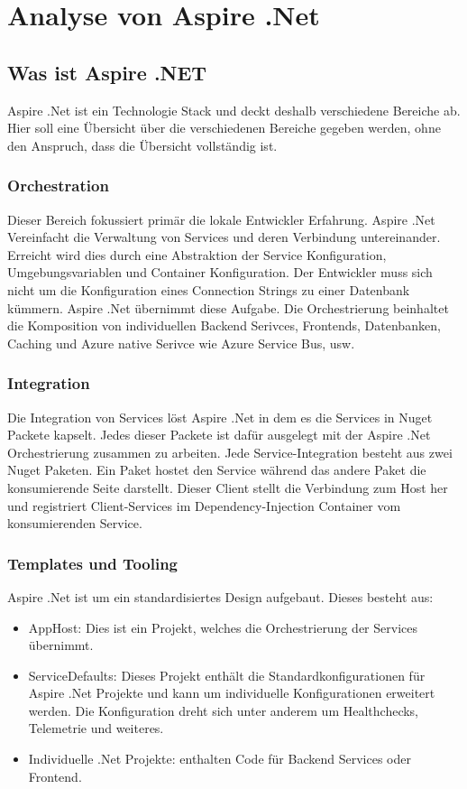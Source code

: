 \section{Analyse von Aspire .Net}

    \subsection{Was ist Aspire .NET}
        Aspire .Net ist ein Technologie Stack und deckt deshalb verschiedene Bereiche ab. Hier soll eine Übersicht über die verschiedenen Bereiche gegeben werden, ohne den Anspruch, dass die Übersicht vollständig ist.

        \subsubsection{Orchestration}
            Dieser Bereich fokussiert primär die lokale Entwickler Erfahrung. Aspire .Net Vereinfacht die Verwaltung von Services und deren Verbindung untereinander. Erreicht wird dies durch eine Abstraktion der Service Konfiguration, Umgebungsvariablen und Container Konfiguration. Der Entwickler muss sich nicht um die Konfiguration eines Connection Strings zu einer Datenbank kümmern. Aspire .Net übernimmt diese Aufgabe. Die Orchestrierung beinhaltet die Komposition von individuellen Backend Serivces, Frontends, Datenbanken, Caching und Azure native Serivce wie Azure Service Bus, usw.

        \subsubsection{Integration}
            Die Integration von Services löst Aspire .Net in dem es die Services in Nuget Packete kapselt. Jedes dieser Packete ist dafür ausgelegt mit der Aspire .Net Orchestrierung zusammen zu arbeiten. Jede Service-Integration besteht aus zwei Nuget Paketen. Ein Paket hostet den Service während das andere Paket die konsumierende Seite darstellt. Dieser Client stellt die Verbindung zum Host her und registriert Client-Services im Dependency-Injection Container vom konsumierenden Service.

        \subsubsection{Templates und Tooling}
            Aspire .Net ist um ein standardisiertes Design aufgebaut. Dieses besteht aus:
            \begin{itemize}
                \item AppHost: Dies ist ein Projekt, welches die Orchestrierung der Services übernimmt.
                \item ServiceDefaults: Dieses Projekt enthält die Standardkonfigurationen für Aspire .Net Projekte und kann um individuelle Konfigurationen erweitert werden. Die Konfiguration dreht sich unter anderem um Healthchecks, Telemetrie und weiteres.
                \item Individuelle .Net Projekte: enthalten Code für Backend Services oder Frontend.
            \end{itemize}

